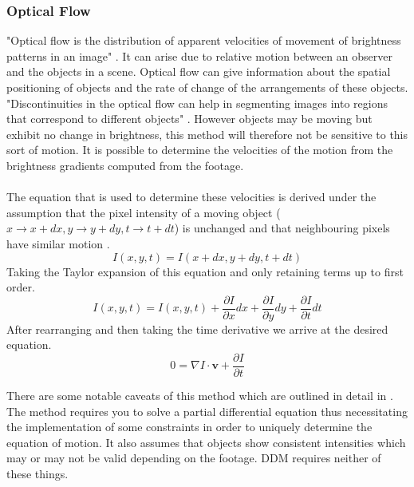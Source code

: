\documentclass[11pt]{article}
\begin{document}
\subsubsection{Optical Flow}
"Optical flow is the distribution of apparent velocities of movement of brightness patterns in an image" \cite{optical_flow}. It can arise due to relative motion between an observer and the objects in a scene. Optical flow can give information about the spatial positioning of objects and the rate of change of the arrangements of these objects. "Discontinuities in the optical flow can help in segmenting images into regions that correspond to different objects" \cite{optical_flow}. However objects may be moving but exhibit no change in brightness, this method will therefore not be sensitive to this sort of motion. It is possible to determine the velocities of the motion from the brightness gradients computed from the footage.
\\\\
The equation that is used to determine these velocities is derived under the assumption that the pixel intensity of a moving object ($x \rightarrow x + dx, y \rightarrow y + dy, t \rightarrow t + dt $) is unchanged and that neighbouring pixels have similar motion \cite{optical_flow_opencv}.
\begin{equation}
I(x, y, t) = I(x + dx, y + dy, t + dt)
\end{equation}
Taking the Taylor expansion of this equation and only retaining terms up to first order.
\begin{equation}
I(x, y, t) = I(x, y, t) + \frac{\partial I}{\partial x} dx + \frac{\partial I}{\partial y} dy + \frac{\partial I}{\partial t} dt
\end{equation}
After rearranging and then taking the time derivative we arrive at the desired equation.
\begin{equation}
0 = \nabla I \cdot \textbf{v} + \frac{\partial I}{\partial t}
\end{equation}
 
There are some notable caveats of this method which are outlined in detail in \cite{optical_flow}. The method requires you to solve a partial differential equation thus necessitating the implementation of some constraints in order to uniquely determine the equation of motion. It also assumes that objects show consistent intensities which may or may not be valid depending on the footage. DDM requires neither of these things.
\end{document}
